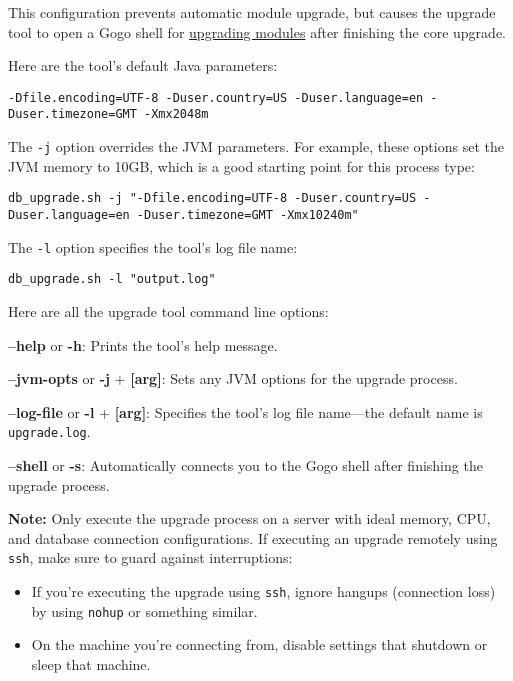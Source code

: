 This configuration prevents automatic module upgrade, but causes the
upgrade tool to open a Gogo shell for
\href{/docs/7-2/deploy/-/knowledge_base/d/upgrading-modules-using-gogo-shell}{upgrading
modules} after finishing the core upgrade.

Here are the tool's default Java parameters:

\begin{verbatim}
-Dfile.encoding=UTF-8 -Duser.country=US -Duser.language=en -Duser.timezone=GMT -Xmx2048m 
\end{verbatim}

The \texttt{-j} option overrides the JVM parameters. For example, these
options set the JVM memory to 10GB, which is a good starting point for
this process type:

\begin{verbatim}
db_upgrade.sh -j "-Dfile.encoding=UTF-8 -Duser.country=US -Duser.language=en -Duser.timezone=GMT -Xmx10240m"
\end{verbatim}

The \texttt{-l} option specifies the tool's log file name:

\begin{verbatim}
db_upgrade.sh -l "output.log"
\end{verbatim}

Here are all the upgrade tool command line options:

\textbf{--help} or \textbf{-h}: Prints the tool's help message.

\textbf{--jvm-opts} or \textbf{-j} + \textbf{{[}arg{]}}: Sets any JVM
options for the upgrade process.

\textbf{--log-file} or \textbf{-l} + \textbf{{[}arg{]}}: Specifies the
tool's log file name---the default name is \texttt{upgrade.log}.

\textbf{--shell} or \textbf{-s}: Automatically connects you to the Gogo
shell after finishing the upgrade process.

\noindent\hrulefill

\textbf{Note:} Only execute the upgrade process on a server with ideal
memory, CPU, and database connection configurations. If executing an
upgrade remotely using \texttt{ssh}, make sure to guard against
interruptions:

\begin{itemize}
\tightlist
\item
  If you're executing the upgrade using \texttt{ssh}, ignore hangups
  (connection loss) by using \texttt{nohup} or something similar.
\item
  On the machine you're connecting from, disable settings that shutdown
  or sleep that machine.
\end{itemize}

